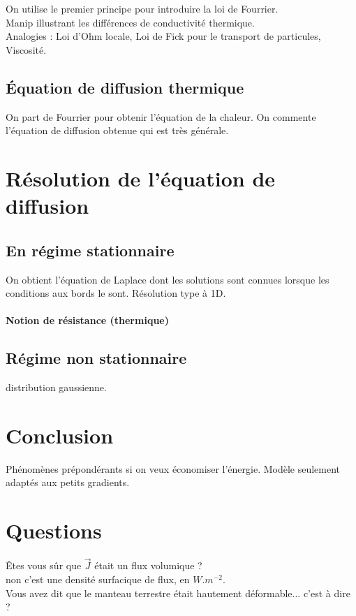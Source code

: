 \documentclass[12pt,prb,aps,epsf]{article}
\begin{document}
On utilise le premier principe pour introduire la loi de Fourrier.\\
Manip illustrant les différences de conductivité thermique.\\
Analogies : Loi d'Ohm locale, Loi de Fick pour le transport de particules, Viscosité.

\subsection{Équation de diffusion thermique}
On part de Fourrier pour obtenir l'équation de la chaleur. On commente l'équation de diffusion obtenue qui est très générale.

\section{Résolution de l'équation de diffusion}
\subsection{En régime stationnaire}
On obtient l'équation de Laplace dont les solutions sont connues lorsque les conditions aux bords le sont. Résolution type à 1D.
\paragraph{Notion de résistance (thermique)}

\subsection{Régime non stationnaire}
distribution gaussienne.

\section{Conclusion}
Phénomènes prépondérants si on veux économiser l'énergie. Modèle seulement adaptés aux petits gradients.

\section*{Questions}
Êtes vous sûr que $\vec{J}$ était un flux volumique ?\\
non c'est une densité surfacique de flux, en $W.m^{-2}$.\\

Vous avez dit que le manteau terrestre était hautement déformable... c'est à dire ?\\
\end{document}
